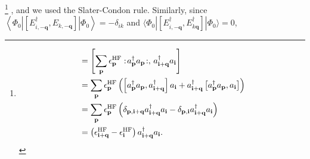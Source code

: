 \footnote{
\begin{align}
[\hat F,E_{i\mathbf q}^{\dagger}]
&=
\left[
\sum_{\mathbf p}
\epsilon_{\mathbf p}^{\rm HF}
:\!a_{\mathbf p}^{\dagger}a_{\mathbf p}\!:,
\,
a_{\mathbf{i}+\mathbf q}^{\dagger}a_{\mathbf i}
\right]
\\
&=
\sum_{\mathbf p}
\epsilon_{\mathbf p}^{\rm HF}
\left(
\left[
a_{\mathbf p}^{\dagger}a_{\mathbf p},
a_{\mathbf{i}+\mathbf q}^{\dagger}
\right]
a_{\mathbf i}
+
a_{\mathbf{i}+\mathbf q}^{\dagger}
\left[
a_{\mathbf p}^{\dagger}a_{\mathbf p},
a_{\mathbf i}
\right]
\right)
\\
&=
\sum_{\mathbf p}
\epsilon_{\mathbf p}^{\rm HF}
\left(
\delta_{\mathbf p,\mathbf{i}+\mathbf q}
a_{\mathbf{i}+\mathbf q}^{\dagger}a_{\mathbf i}
-
\delta_{\mathbf p,\mathbf i}
a_{\mathbf{i}+\mathbf q}^{\dagger}a_{\mathbf i}
\right)
\\
&=
\left(
\epsilon_{\mathbf{i}+\mathbf q}^{\rm HF}
-
\epsilon_{\mathbf i}^{\rm HF}
\right)
a_{\mathbf{i}+\mathbf q}^{\dagger}a_{\mathbf i}.
\end{align}}
, and we used the Slater-Condon rule.
Similarly, since
$\left\langle\Phi_0\left|
\left[
E_{i,-\mathbf q}^{\dagger},
E_{k,-\mathbf q}
\right]
\right|\Phi_0\right\rangle
=
-\delta_{ik}$
and
$\langle \Phi_0|\left[
E_{i,-\mathbf q}^{\dagger},
E_{k\mathbf q}^{\dagger}
\right]|\Phi_0\rangle
=
0$,
